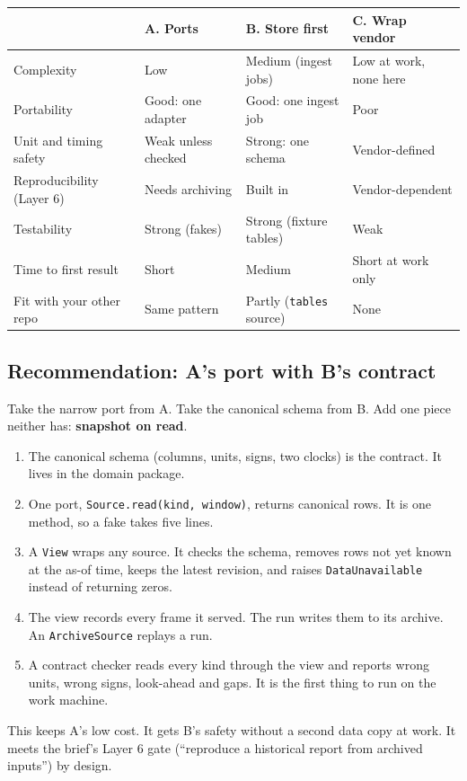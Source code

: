 \documentclass[11pt,a4paper]{article}
\newcommand{\code}[1]{\texttt{\small #1}}
\begin{document}
\begin{center}\small
\begin{tabularx}{\linewidth}{@{}lXXX@{}}\toprule
 & A. Ports & B. Store first & C. Wrap vendor \\\midrule
Complexity & Low & Medium (ingest jobs) & Low at work, none here \\
Portability & Good: one adapter & Good: one ingest job & Poor \\
Unit and timing safety & Weak unless checked & Strong: one schema & Vendor-defined \\
Reproducibility (Layer 6) & Needs archiving & Built in & Vendor-dependent \\
Testability & Strong (fakes) & Strong (fixture tables) & Weak \\
Time to first result & Short & Medium & Short at work only \\
Fit with your other repo & Same pattern & Partly (\code{tables} source) & None \\\bottomrule
\end{tabularx}
\end{center}

\subsection{Recommendation: A's port with B's contract}
Take the narrow port from A. Take the canonical schema from B. Add one piece neither has: \textbf{snapshot on read}.
\begin{enumerate}
\item The canonical schema (columns, units, signs, two clocks) is the contract. It lives in the domain package.
\item One port, \code{Source.read(kind, window)}, returns canonical rows. It is one method, so a fake takes five lines.
\item A \code{View} wraps any source. It checks the schema, removes rows not yet known at the as-of time, keeps the latest revision, and raises \code{DataUnavailable} instead of returning zeros.
\item The view records every frame it served. The run writes them to its archive. An \code{ArchiveSource} replays a run.
\item A contract checker reads every kind through the view and reports wrong units, wrong signs, look-ahead and gaps. It is the first thing to run on the work machine.
\end{enumerate}
This keeps A's low cost. It gets B's safety without a second data copy at work. It meets the brief's Layer 6 gate (``reproduce a historical report from archived inputs'') by design.
\end{document}
